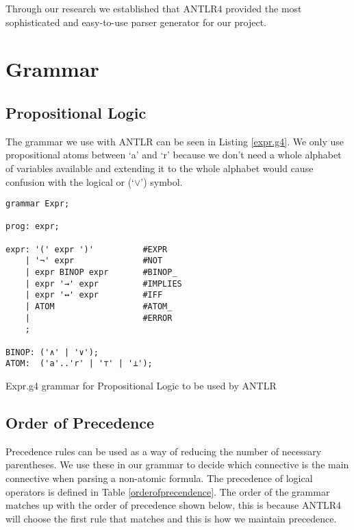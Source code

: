\documentclass{report}
\begin{document}
Through our research we established that ANTLR4 provided the most sophisticated and easy-to-use parser generator for our project.

\section{Grammar}

\subsection{Propositional Logic}

The grammar we use with ANTLR can be seen in Listing \ref{expr.g4}. We only use propositional atoms between `a' and `r' because we don't need a whole alphabet of variables available and extending it to the whole alphabet would cause confusion with the logical or (`$\lor$') symbol. 

\begin{listing}[ht]
\begin{verbatim}
grammar Expr;   

prog: expr;

expr: '(' expr ')'          #EXPR
    | '¬' expr              #NOT
    | expr BINOP expr       #BINOP_
    | expr '→' expr         #IMPLIES
    | expr '↔' expr         #IFF
    | ATOM                  #ATOM_
    |                       #ERROR
    ;

BINOP: ('∧' | '∨');
ATOM:  ('a'..'r' | '⊤' | '⊥');

\end{verbatim}
\caption{Expr.g4 grammar for Propositional Logic to be used by ANTLR}
\label{expr.g4}
\end{listing}

\subsection{Order of Precedence}

Precedence rules can be used as a way of reducing the number of necessary parentheses. We use these in our grammar to decide which connective is the main connective when parsing a non-atomic formula. The precedence of logical operators is defined in Table \ref{orderofprecendence}. The order of the grammar matches up with the order of precedence shown below, this is because ANTLR4 will choose the first rule that matches and this is how we maintain precedence.
\end{document}
